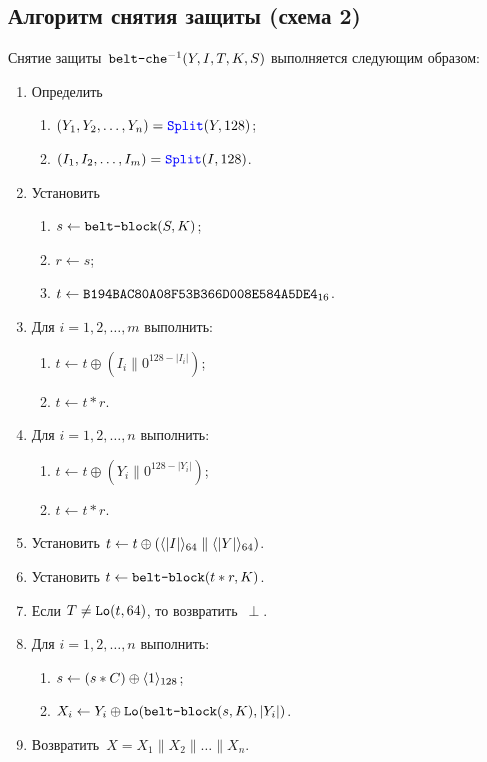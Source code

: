 \subsection{Алгоритм снятия защиты (схема 2)}\label{AE.CHE.Unwrap}

Снятие защиты~$\texttt{belt-che}^{-1}(Y,I,T,K,S)$ выполняется следующим образом:
\begin{enumerate}
\item
Определить 
\begin{enumerate}
\item
$(Y_1,Y_2,\ldots,Y_n)=\mathop{\textcolor{blue}{\texttt{Split}}}\nolimits(Y, 128)$;
\item
$(I_1,I_2,\ldots,I_m)=\mathop{\textcolor{blue}{\texttt{Split}}}\nolimits(I, 128)$. 
\end{enumerate}
\item
Установить
\begin{enumerate}
\item
$s\leftarrow\texttt{belt-block}(S,K)$;
\item
$r\leftarrow s$;
\item
$t\leftarrow\texttt{B194BAC80A08F53B366D008E584A5DE4}_{16}$.
\end{enumerate}

\item
Для $i=1,2,\ldots,m$ выполнить:
\begin{enumerate}
\item
$t\leftarrow t\oplus (I_i\parallel 0^{128-|I_i|})$;
\item
$t\leftarrow t\ast r$.
\end{enumerate}

\item\label{Step.AE.CHE.StepA}
Для $i=1,2,\ldots,n$ выполнить:
\begin{enumerate}
\item
$t\leftarrow t\oplus (Y_i\parallel 0^{128-|Y_i|})$;
\item
$t\leftarrow t\ast r$.
\end{enumerate}

\item
Установить
$t\leftarrow t\oplus (\langle|I|\rangle_{64}\parallel\langle|Y|\rangle_{64})$.

\item
Установить
$t\leftarrow\texttt{belt-block}(t\ast r,K)$.

\item\label{Step.AE.CHE.VerifyMAC}
Если $T\neq\mathop{\texttt{Lo}}\nolimits(t, 64)$, то возвратить~$\perp$.

\item\label{Step.AE.CHE.StepD}
Для $i=1,2,\ldots,n$ выполнить:
\begin{enumerate}
\item
$s\leftarrow (s\ast C)\oplus\langle1\rangle_{128}$;
\item
$X_i\leftarrow Y_i\oplus \mathop{\texttt{Lo}}\nolimits(\texttt{belt-block}(s,K), |Y_i|)$.
\end{enumerate}
\item
Возвратить~$X=X_1\parallel X_2\parallel\ldots\parallel X_n$.
\end{enumerate}


